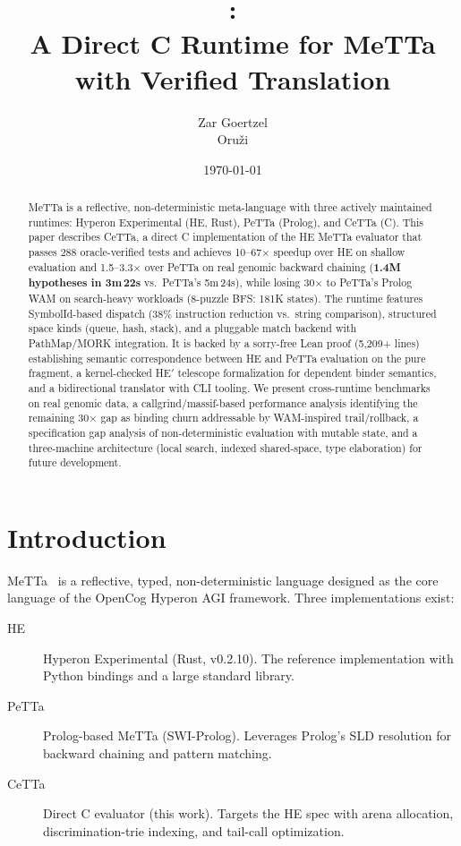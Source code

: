 \documentclass[11pt]{article}
\title{\CeTTa{}:\\
\large A Direct C Runtime for MeTTa with Verified Translation}
\author{Zar Goertzel\\Oru\v{z}i}
\date{\today}
\newcommand{\PeTTa}{\textup{PeTTa}}
\newcommand{\HE}{\textup{HE}}
\newcommand{\CeTTa}{\textup{CeTTa}}
\begin{document}
\maketitle

\begin{abstract}
MeTTa is a reflective, non-deterministic meta-language with three
actively maintained runtimes: Hyperon Experimental (\HE{}, Rust),
\PeTTa{} (Prolog), and \CeTTa{} (C).  This paper describes \CeTTa{},
a direct C implementation of the \HE{} MeTTa evaluator that passes 288
oracle-verified tests and achieves 10--67$\times$ speedup over \HE{} on
shallow evaluation and 1.5--3.3$\times$ over \PeTTa{} on real genomic
backward chaining (\textbf{1.4M hypotheses in 3m\,22s} vs.\ \PeTTa{}'s
5m\,24s), while losing 30$\times$ to \PeTTa{}'s Prolog WAM on
search-heavy workloads (8-puzzle BFS: 181K states).  The runtime
features SymbolId-based dispatch (38\% instruction reduction vs.\
string comparison), structured space kinds (queue, hash, stack), and a
pluggable match backend with PathMap/MORK integration.  It is backed by
a sorry-free Lean proof (5{,}209+ lines) establishing semantic
correspondence between \HE{} and \PeTTa{} evaluation on the pure
fragment, a kernel-checked HE$'$ telescope formalization for dependent
binder semantics, and a bidirectional translator with CLI tooling.
We present cross-runtime benchmarks on real genomic data, a
callgrind/massif-based performance analysis identifying the remaining
30$\times$ gap as binding churn addressable by WAM-inspired
trail/rollback, a specification gap analysis of non-deterministic
evaluation with mutable state, and a three-machine architecture
(local search, indexed shared-space, type elaboration) for future
development.
\end{abstract}

\section{Introduction}

MeTTa~\cite{metta} is a reflective, typed, non-deterministic language
designed as the core language of the OpenCog Hyperon AGI framework.
Three implementations exist:

\begin{description}
\item[\HE{}] Hyperon Experimental (Rust, v0.2.10).  The reference
  implementation with Python bindings and a large standard library.
\item[\PeTTa{}] Prolog-based MeTTa (SWI-Prolog).  Leverages Prolog's
  SLD resolution for backward chaining and pattern matching.
\item[\CeTTa{}] Direct C evaluator (this work).  Targets the \HE{} spec
  with arena allocation, discrimination-trie indexing, and tail-call
  optimization.
\end{description}
\end{document}
